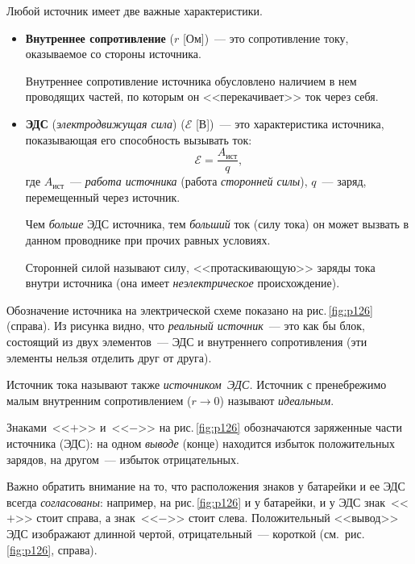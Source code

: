 \documentclass[main.tex]{subfiles}
\begin{document}
Любой источник имеет две важные характеристики.
\begin{itemize}
    \item \textbf{Внутреннее сопротивление} ($r$ [Ом])~--- это сопротивление току, оказываемое со стороны источника.
    
    Внутреннее сопротивление источника обусловлено наличием в нем проводящих частей, по которым он <<перекачивает>> ток через себя.
    
    \item \textbf{ЭДС} (\emph{электродвижущая сила}) ($\mathscr E$ [В])~--- это характеристика источника, показывающая его способность вызывать ток:
    \begin{equation}
        \mathscr E=\frac{A_\text{ист}}{q},
    \end{equation}
    где $A_\text{ист}$~--- \emph{работа источника} (работа \emph{сторонней силы}), $q$~--- заряд, перемещенный через источник.

    Чем \emph{больше} ЭДС источника, тем \emph{больший} ток (силу тока) он может вызвать в данном проводнике при прочих равных условиях. 
    
    Сторонней силой называют силу, <<протаскивающую>> заряды тока внутри источника (она имеет \emph{неэлектрическое} происхождение). 
\end{itemize}

Обозначение источника на электрической схеме показано на рис.\,\ref{fig:p126} (справа). Из рисунка видно, что \emph{реальный источник}~--- это как бы блок, состоящий из двух элементов~--- ЭДС и внутреннего сопротивления (эти элементы нельзя отделить друг от друга). 

Источник тока называют также \emph{источником~ЭДС.} Источник с пренебрежимо малым внутренним сопротивлением ($r\to 0$) называют \emph{идеальным}.

Знаками~<<$+$>> и~<<$-$>> на рис.\,\ref{fig:p126} обозначаются заряженные части источника (ЭДС): на одном \emph{выводе} (конце) находится избыток положительных зарядов, на другом~--- избыток отрицательных.

Важно обратить внимание на то, что расположения знаков у батарейки и ее ЭДС всегда \emph{согласованы}: например, на рис.\,\ref{fig:p126} и у батарейки, и у ЭДС знак~<<$+$>> стоит справа, а знак~<<$-$>> стоит слева. Положительный <<вывод>> ЭДС изображают длинной чертой, отрицательный~--- короткой (см.~рис.\,\ref{fig:p126}, справа). 




\end{document}
